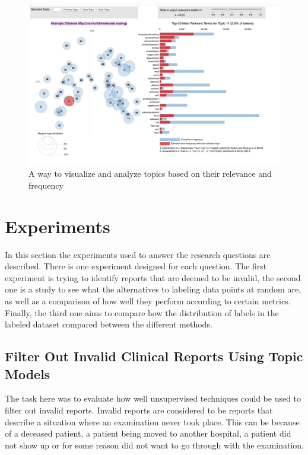 \begin{figure}
    \centering
    \includegraphics[width=\textwidth]{figures/ldavis-sample.png}
    \caption{A way to visualize and analyze topics based on their relevance and frequency}
    \label{fig:ldavis-sample}
\end{figure}

\section{Experiments}\label{sec:exp1-method}
In this section the experiments used to answer the research questions are described.
There is one experiment designed for each question.
The first experiment is trying to identify reports that are deemed to be invalid, the second one is a study to see what the alternatives to labeling data points at random are, as well as a comparison of how well they perform according to certain metrics.
Finally, the third one aims to compare how the distribution of labels in the labeled dataset compared between the different methods.

\subsection{Filter Out Invalid Clinical Reports Using Topic Models}

The task here was to evaluate how well unsupervised techniques could be used to filter out invalid reports.
Invalid reports are considered to be reports that describe a situation where an examination never took place.
This can be because of a deceased patient, a patient being moved to another hospital, a patient did not show up or for some reason did not want to go through with the examination.

